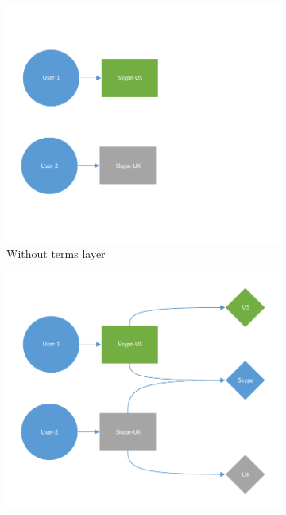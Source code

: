 \documentclass[ijoc,nonblindrev]{informs3} %
\numberwithin{equation}{subsection}
\begin{document}
 

\begin{figure}[t]
\centering
\begin{subfigure}[b]{0.49\textwidth}
	\centering
	\includegraphics[width=\textwidth]{figures/skype_exampe1.pdf}
	\caption{Without terms layer}
\end{subfigure}
\begin{subfigure}[b]{0.49\textwidth}
	\centering
	\includegraphics[width=\textwidth]{figures/skype_exampe2.pdf}

\end{subfigure}
\end{figure}
\end{document}
